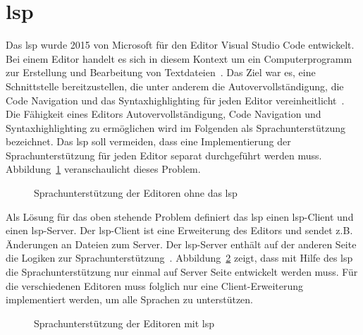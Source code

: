 \section{\acs{lsp}}

Das \ac{lsp} wurde 2015 von Microsoft für den Editor Visual Studio Code entwickelt.
Bei einem Editor handelt es sich in diesem Kontext um ein Computerprogramm zur Erstellung und Bearbeitung von Textdateien~\cite{editor-definition}.
Das Ziel war es, eine Schnittstelle bereitzustellen, die unter anderem die Autovervollständigung, die Code Navigation und das Syntaxhighlighting
für jeden Editor vereinheitlicht~\cite{lsp-witekio}.
Die Fähigkeit eines Editors Autovervollständigung, Code Navigation und Syntaxhighlighting zu ermöglichen wird im Folgenden als Sprachunterstützung bezeichnet.
Das \ac{lsp} soll vermeiden, dass eine Implementierung der Sprachunterstützung für jeden Editor separat durchgeführt werden muss.
Abbildung~\ref{fig:without-lsp} veranschaulicht dieses Problem.

\begin{figure}[htp] %
    \centering
    \caption{Sprachunterstützung der Editoren ohne das \acs{lsp}}
    \label{fig:without-lsp}
\end{figure}

Als Lösung für das oben stehende Problem definiert das \ac{lsp} einen \ac{lsp}-Client und einen \ac{lsp}-Server.
Der \ac{lsp}-Client ist eine Erweiterung des Editors und sendet z.B. Änderungen an Dateien zum Server.
Der \ac{lsp}-Server enthält auf der anderen Seite die Logiken zur Sprachunterstützung~\cite{lsp-witekio}.
Abbildung~\ref{fig:with-lsp} zeigt, dass mit Hilfe des \ac{lsp} die Sprachunterstützung nur einmal auf Server Seite entwickelt werden muss.
Für die verschiedenen Editoren muss folglich nur eine Client-Erweiterung implementiert werden, um alle Sprachen zu unterstützen.

\begin{figure}[htp] %
    \centering
    \caption{Sprachunterstützung der Editoren mit \acs{lsp}}
    \label{fig:with-lsp}
\end{figure}

